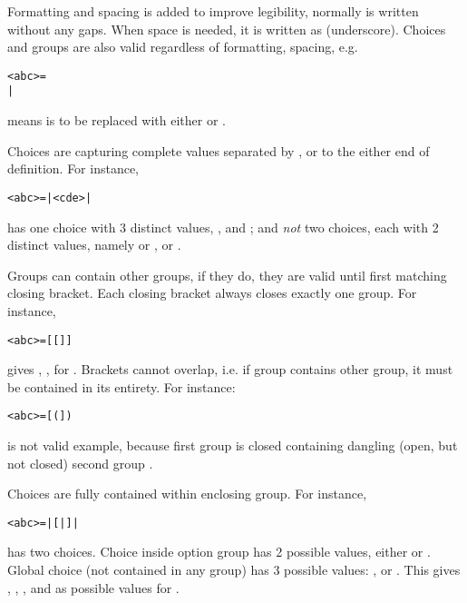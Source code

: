 Formatting and spacing is added to improve legibility, normally  is
written without any gaps. When space is needed, it is written as \alg{\_}
(underscore). Choices and groups are also valid regardless of formatting,
spacing, e.g.
\begin{alltt}
<abc> = 
  | 
\end{alltt}
means  is to be replaced with either  or .

Choices are capturing complete values separated by \algfmt{|}, or to the either
end of definition. For instance,
\begin{alltt}
<abc> =  |  <cde>  | 
\end{alltt}
has one choice with 3 distinct values, ,  and
; and \emph{not} two choices, each with 2 distinct values, namely  or
,  or .

Groups can contain other groups, if they do, they are valid until first matching
closing bracket. Each closing bracket always closes exactly one group. For instance,
\begin{alltt}
<abc> =  [  [  ]  ] 
\end{alltt}
gives , ,  for .
Brackets cannot overlap, i.e. if group contains other group, it must be contained in
its entirety. For instance:
\begin{alltt}
<abc> =  [  (  ]  ) 
\end{alltt}
is not valid example, because first group \algfmt{[ ]} is closed containing
dangling (open, but not closed) second group \algfmt{( )}.

\clearpage %

Choices are fully contained within enclosing group. For instance,
\begin{alltt}
<abc> =  |  [  |  ]  | 
\end{alltt}
has two choices. Choice inside option group \algfmt{[ ]} has 2 possible values,
either  or . Global choice (not contained in any group) has 3 possible
values: , \algfmt{[}\algfmt{|}\algfmt{]} or .
This gives , , ,  and  as possible values for
.


